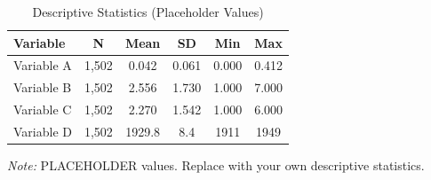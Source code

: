 
\begin{table}[htbp]
  \centering
  \caption{Descriptive Statistics (Placeholder Values)}
  \label{tab:descriptive}
  \begin{threeparttable}
  \small
  \begin{tabular}{lccccc}
    \toprule
    Variable & N & Mean & SD & Min & Max \\
    \midrule
    Variable A & 1,502 & 0.042 & 0.061 & 0.000 & 0.412 \\
    Variable B & 1,502 & 2.556 & 1.730 & 1.000 & 7.000 \\
    Variable C & 1,502 & 2.270 & 1.542 & 1.000 & 6.000 \\
    Variable D & 1,502 & 1929.8 & 8.4 & 1911 & 1949 \\
    \bottomrule
  \end{tabular}
  \begin{tablenotes}
    \footnotesize
    \item \textit{Note:} PLACEHOLDER values. Replace with your own
    descriptive statistics.
  \end{tablenotes}
  \end{threeparttable}
\end{table}
